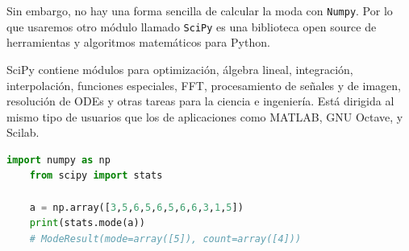 Sin embargo, no hay una forma sencilla de calcular la moda con \texttt{Numpy}. Por lo que usaremos otro módulo llamado \texttt{SciPy} es una biblioteca open source de herramientas y algoritmos matemáticos para Python.

SciPy contiene módulos para optimización, álgebra lineal, integración, interpolación, funciones especiales, FFT, procesamiento de señales y de imagen, resolución de ODEs y otras tareas para la ciencia e ingeniería. Está dirigida al mismo tipo de usuarios que los de aplicaciones como MATLAB, GNU Octave, y Scilab.

\begin{lstlisting}[language=Python]
	import numpy as np
	from scipy import stats
	
	a = np.array([3,5,6,5,6,5,6,6,3,1,5])
	print(stats.mode(a))
	# ModeResult(mode=array([5]), count=array([4]))
\end{lstlisting}


